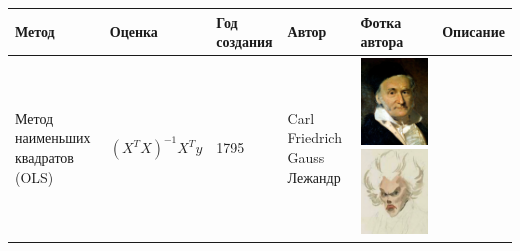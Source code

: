 \documentclass[10pt,a4paper]{article}
\begin{document}
\begin{table}
\begin{tabular} {|p{3cm}|p{4cm}|p{2cm}|p{2cm}|p{4cm}|p{10cm}|}
\hline
Метод & Оценка & Год создания & Автор & Фотка автора & Описание \\
\hline
Метод наименьших квадратов (OLS) & \begin{center}
 $(X^{T}X)^{-1}X^Ty$ \end{center} & 1795 & Carl Friedrich Gauss \newline Лежандр &  

\vfill \includegraphics[width=0.49\linewidth]{gauss.jpg}\includegraphics[width=0.49\linewidth]{lezhandr.jpg} 


\end{tabular}
\end{table}
\end{document}
